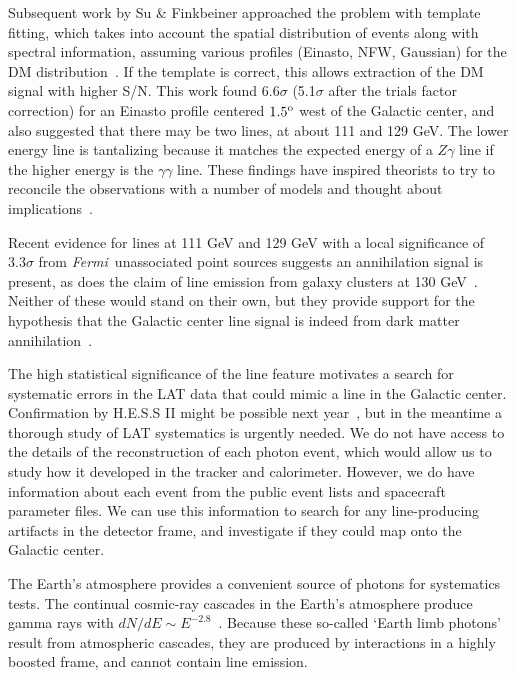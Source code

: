 \documentclass[aps,twocolumn,prd,superscriptaddress,showpacs,nofootinbib,fixfloat]{revtex4}
\newcommand{\Fermi}{{\slshape Fermi}}
\newcommand{\degree}{^{\rm o}}
\begin{document}
Subsequent work by Su \& Finkbeiner approached the problem
with template fitting, which takes into account the spatial
distribution of events along with spectral information,
assuming various profiles (Einasto, NFW, Gaussian) for the
DM distribution~\citep{linepaper}.  If the template is
correct, this allows extraction of the DM signal with
higher S/N.  This work found 6.6$\sigma$ (5.1$\sigma$ after
the trials factor correction) for an Einasto profile
centered $1.5\degree$ west of the Galactic center, and also
suggested that there may be two lines, at about 111 and 129
GeV.  The lower energy line is tantalizing because it
matches the expected energy of a $Z\gamma$ line if the
higher energy is the $\gamma\gamma$ line.  These findings
have inspired theorists to try to reconcile the observations
with a number of models and thought about implications~\citep{Dudas:2012, Choi:2012,
  Kyae:2012, Lee:2012, Rajaraman:2012, Acharya:2012,
  Garny:2012, Buckley:2012, Chu:2012, Kang:2012,
  Buchmuller:2012, Heo:2012, Park:2012, Tulin:2012,
  Cline:2012, Weiner:2012, Bringmann:2012ez}.

Recent evidence for lines at 111 GeV and 129 GeV with a
local significance of $3.3\sigma$ from \Fermi\ unassociated
point sources suggests an annihilation signal is present, as
does the claim of line emission from galaxy clusters at 130
GeV~\cite{Hektor:2012kc}.  Neither of these would stand on
their own, but they provide support for the hypothesis that
the Galactic center line signal is indeed from dark matter
annihilation~\cite{doubleline}.

The high statistical significance of the line
feature motivates a search for systematic errors in the
LAT data that could mimic a line in the Galactic center.
Confirmation by H.E.S.S II might be possible next
year~\cite{Bergstrom:2012}, but in the meantime a thorough
study of LAT systematics is urgently needed.  We do not have
access to the details of the reconstruction of each photon
event, which would allow us to study how it developed in the
tracker and calorimeter.  However, we do have information
about each event from the public event lists and spacecraft
parameter files.  We can use this information to search for
any line-producing artifacts in the detector frame, and
investigate if they could map onto the Galactic center.

The Earth's atmosphere provides a convenient source of
photons for systematics tests.  The continual cosmic-ray
cascades in the Earth's atmosphere produce gamma rays with
$dN/dE \sim E^{-2.8}$~\citep{FermiLimb}.  Because these
so-called `Earth limb photons' result from atmospheric
cascades, they are produced by interactions in a highly
boosted frame, and cannot contain line emission.
\end{document}
